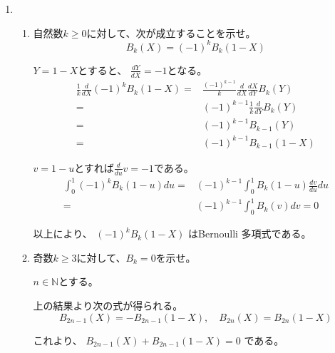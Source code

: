 \documentclass[12pt,b5paper]{ltjsarticle}
\begin{document}
\begin{enumerate}
 \item
      \begin{enumerate}
       \item

            自然数$k\geq 0$に対して、次が成立することを示せ。
            \begin{equation}
             B_{k}(X) = (-1)^{k}B_{k}(1-X)
            \end{equation}

\dotfill

            $Y=1-X$とすると、
            $\frac{dY}{dX} = -1$となる。
            \begin{align}
             \frac{1}{k} \frac{d}{dX} (-1)^{k}B_{k}(1-X)
              =& \frac{(-1)^{k-1}}{k} \frac{d}{dX} \frac{dX}{dY} B_{k}(Y)\\
              =& (-1)^{k-1} \frac{1}{k} \frac{d}{dY}B_{k}(Y)\\
              =& (-1)^{k-1} B_{k-1}(Y)\\
              =& (-1)^{k-1} B_{k-1}(1-X)
            \end{align}

            $v=1-u$とすれば$\frac{d}{du}v = -1$である。
            \begin{align}
             \int_{0}^{1} (-1)^{k}B_{k}(1-u) du
              =& (-1)^{k-1} \int_{0}^{1} B_{k}(1-u)\frac{dv}{du} du\\
              =& (-1)^{k-1} \int_{0}^{1} B_{k}(v)dv
              =0
            \end{align}


            以上により、
            $(-1)^{k}B_{k}(1-X)$
            はBernoulli 多項式である。


\hrulefill

       \item
            奇数$k\geq 3$に対して、$B_{k}=0$を示せ。

\dotfill


            $n\in\mathbb{N}$とする。

            上の結果より次の式が得られる。
            \begin{equation}
             B_{2n-1}(X) = -B_{2n-1}(1-X)
              ,\quad
              B_{2n}(X) = B_{2n}(1-X)
            \end{equation}

            これより、
            $B_{2n-1}(X) + B_{2n-1}(1-X) =0$
            である。


\end{enumerate}
\end{enumerate}
\end{document}

